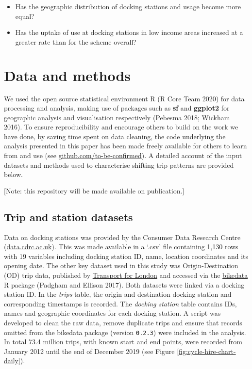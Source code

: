 \documentclass[]{article}
\providecommand{\tightlist}{%
  \setlength{\itemsep}{0pt}\setlength{\parskip}{0pt}}
\begin{document}
\begin{itemize}
\tightlist
\item
  Has the geographic distribution of docking stations and usage become more equal?
\item
  Has the uptake of use at docking stations in low income areas increased at a greater rate than for the scheme overall?
\end{itemize}

\hypertarget{data-and-methods}{%
\section{Data and methods}\label{data-and-methods}}

We used the open source statistical environment R (R Core Team 2020) for data processing and analysis, making use of packages such as \textbf{sf} and \textbf{ggplot2} for geographic analysis and visualisation respectively (Pebesma 2018; Wickham 2016).
To ensure reproducibility and encourage others to build on the work we have done, by saving time spent on data cleaning, the code underlying the analysis presented in this paper has been made freely available for others to learn from and use (see \href{https://github.com}{github.com/to-be-confirmed}).
A detailed account of the input datasets and methods used to characterise shifting trip patterns are provided below.

{[}Note: this repository will be made available on publication.{]}

\hypertarget{trip-and-station-datasets}{%
\subsection{Trip and station datasets}\label{trip-and-station-datasets}}

Data on docking stations was provided by the Consumer Data Research Centre (\href{https://data.cdrc.ac.uk/product/ffc94eb2-baf0-46f9-bf7d-5e8dd424b95d?accesslevel=open\&q=\&sort=title_string+asc}{data.cdrc.ac.uk}).
This was made available in a `.csv' file containing 1,130 rows with 19 variables including docking station ID, name, location coordinates and its opening date.
The other key dataset used in this study was Origin-Destination (OD) trip data, published by \href{https://cycling.data.tfl.gov.uk}{Transport for London} and accessed via the \href{https://github.com/ropensci/bikedata}{bikedata} R package (Padgham and Ellison 2017).
Both datasets were linked via a docking station ID.
In the \emph{trips} table, the origin and destination docking station and corresponding timestamps is recorded.
The \emph{docking station} table contains IDs, names and geographic coordinates for each docking station.
A script was developed to clean the raw data, remove duplicate trips and ensure that records omitted from the bikedata package (version \texttt{0.2.3}) were included in the analysis.
In total 73.4 million trips, with known start and end points, were recorded from January 2012 until the end of December 2019 (see Figure \ref{fig:cycle-hire-chart-daily}).
\end{document}
